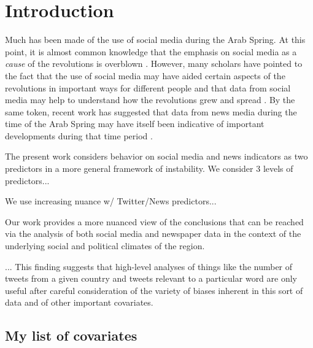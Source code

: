 \section{Introduction}

Much has been made of the use of social media during the Arab Spring. At this point, it is almost common knowledge that the emphasis on social media as a \emph{cause} of the revolutions is overblown \citep{bruns_arab_2013,goldstone_bringing_2013} . However, many scholars have pointed to the fact that the use of social media may have aided certain aspects of the revolutions in important ways for different people  \citep{galle_who_2013,starbird_how_2012,papacharissi_affective_2012} and that data from social media may help to understand how the revolutions grew and spread \citep{lotan_revolutions_2011,bruns_arab_2013}. By the same token, recent work has suggested that data from news media during the time of the Arab Spring may have itself been indicative of important developments during that time period \cite{joseph_arab_2014,pfeffer_rapid_2012}.

The present work considers behavior on social media and news indicators as two predictors in a more general framework of instability. We consider 3 levels of predictors...

We use increasing nuance w/ Twitter/News predictors...

Our work provides a more nuanced view of the conclusions that can be reached via the analysis of both social media and newspaper data in the context of the underlying social and political climates of the region. 

... This finding suggests that high-level analyses of things like the number of tweets from a given country and tweets relevant to a particular word are only useful after careful consideration of the variety of biases inherent in this sort of data and of other important covariates.

\subsection{My list of covariates}

